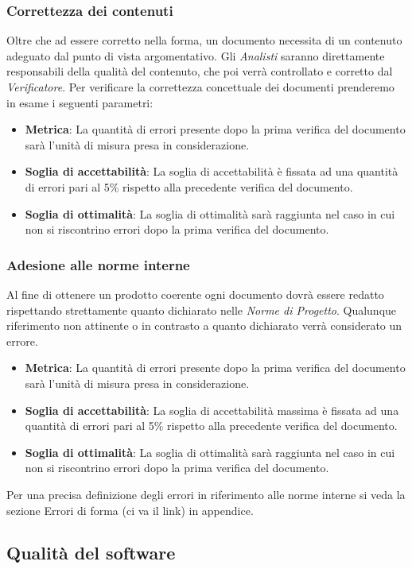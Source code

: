 \subsubsection{Correttezza dei contenuti}
Oltre che ad essere corretto nella forma, un documento necessita di un contenuto adeguato dal punto di vista argomentativo. Gli \textit{Analisti} saranno direttamente responsabili della qualità del contenuto, che poi verrà controllato e corretto dal \textit{Verificatore}.
Per verificare la correttezza concettuale dei documenti prenderemo in esame i seguenti parametri:
\begin{itemize}
	\item \textbf{Metrica}: La quantità di errori presente dopo la prima verifica del documento sarà l'unità di misura presa in considerazione.
	\item \textbf{Soglia di accettabilità}: La soglia di accettabilità è fissata ad una quantità di errori pari al 5\% rispetto alla precedente verifica del documento.
	\item \textbf{Soglia di ottimalità}: La soglia di ottimalità sarà raggiunta nel caso in cui non si riscontrino errori dopo la prima verifica del documento.
\end{itemize}
\subsubsection{Adesione alle norme interne}
Al fine di ottenere un prodotto coerente ogni documento dovrà essere redatto rispettando strettamente quanto dichiarato nelle \textit{Norme di Progetto}.
Qualunque riferimento non attinente o in contrasto a quanto dichiarato verrà considerato un errore.
\begin{itemize}
	\item \textbf{Metrica}: La quantità di errori presente dopo la prima verifica del documento sarà l'unità di misura presa in considerazione. 
	\item \textbf{Soglia di accettabilità}: La soglia di accettabilità massima è fissata ad una quantità di errori pari al 5\% rispetto alla precedente verifica del documento.
	\item \textbf{Soglia di ottimalità}: La soglia di ottimalità sarà raggiunta nel caso in cui non si riscontrino errori dopo la prima verifica del documento.
\end{itemize}
Per una precisa definizione degli errori in riferimento alle norme interne si veda la sezione Errori di forma (ci va il link) in appendice.
\subsection{Qualità del software}

